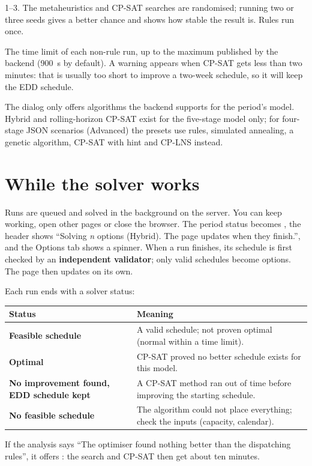 \begin{description}[style=nextline, leftmargin=1.2em, font=\bfseries\color{brand}]
  \item[Seeds for randomised algorithms] 1--3. The metaheuristics and CP-SAT searches are randomised; running
        two or three seeds gives a better chance and shows how stable the result is. Rules run once.
  \item[Budget per run (seconds)] The time limit of each non-rule run, up to the maximum published by the
        backend (900~s by default). A warning appears when CP-SAT gets less than two minutes: that is usually
        too short to improve a two-week schedule, so it will keep the EDD schedule.
\end{description}

\begin{note}
The dialog only offers algorithms the backend supports for the period's model. Hybrid and rolling-horizon
CP-SAT exist for the five-stage model only; for four-stage JSON scenarios (Advanced) the presets use rules,
simulated annealing, a genetic algorithm, CP-SAT with hint and CP-LNS instead.
\end{note}

\section{While the solver works}

Runs are queued and solved in the background on the server. You can keep working, open other pages or
close the browser. The period status becomes , the header shows ``Solving \textit{n} options
(Hybrid). The page updates when they finish.'', and the Options tab shows a spinner. When a run finishes, its
schedule is first checked by an \textbf{independent validator}; only valid schedules become options. The
page then updates on its own.

Each run ends with a solver status:

\begin{center}
\begin{tabularx}{\linewidth}{>{\bfseries}p{5.6cm}X}
\toprule
\rowcolor{white}Status & Meaning \\
\midrule
Feasible schedule & A valid schedule; not proven optimal (normal within a time limit). \\
Optimal & CP-SAT proved no better schedule exists for this model. \\
No improvement found, EDD schedule kept & A CP-SAT method ran out of time before improving the starting schedule. \\
No feasible schedule & The algorithm could not place everything; check the inputs (capacity, calendar). \\
\bottomrule
\end{tabularx}
\end{center}

\begin{tip}
If the analysis says ``The optimiser found nothing better than the dispatching rules'', it offers
: the search and CP-SAT then get about ten minutes.
\end{tip}
